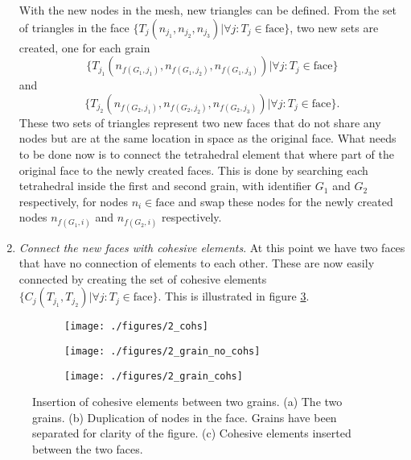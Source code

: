 \documentclass[grain_boundary_law.tex]{subfiles}
\begin{document}
\begin{enumerate}
With the new nodes in the mesh, new triangles can be defined. From the set of triangles in the face $\{ T_j(n_{j_1}, n_{j_2}, n_{j_3}) | \forall j: T_j \in \text{face} \}$, two new sets are created, one for each grain 
\[ \{ T_{j_1}(n_{f(G_1,j_1)}, n_{f(G_1,j_2)}, n_{f(G_1,j_3)}) | \forall j: {T_{j} \in \text{face} \}} \]
 and 
\[ \{ T_{j_2}(n_{f(G_2,j_1)}, n_{f(G_2,j_2)}, n_{f(G_2,j_3)}) | \forall j: {T_{j} \in \text{face} \}}.\]  
 These two sets of triangles represent two new faces that do not share any nodes but are at the same location in space as the original face. What needs to be done now is to connect the tetrahedral element that where part of the original face to the newly created faces. This is done by searching each tetrahedral inside the first and second grain, with identifier $G_1$ and $G_2$ respectively, for nodes $n_i \in \text{face}$ and swap these nodes for the newly created nodes  $n_{f(G_1, i)}$ and $n_{f(G_2, i)}$ respectively.

\item \textit{Connect the new faces with cohesive elements}. At this point we have two faces that have no connection of elements to each other. These are now easily connected by creating the set of cohesive elements $ \{ C_j(T_{j_1},T_{j_2}) |  \forall j: T_j \in \text{face}  \} $. This is illustrated in figure \ref{fig:cohs_2_c}. 
\end{enumerate}


\begin{figure}[htpb!]
\centering
\begin{subfigure}[b]{.5\linewidth}
  \centering
  \texttt{[image: ./figures/2\_cohs]}
  \caption{}
  \label{fig:cohs_2_a}
\end{subfigure}%
\hspace{-10mm}
\begin{subfigure}[b]{.5\linewidth}
  \centering
  \texttt{[image: ./figures/2\_grain\_no\_cohs]}
  \caption{}
  \label{fig:cohs_2_b}
\end{subfigure}%
\hspace{-10mm}
\begin{subfigure}[b]{.5\linewidth}
  \centering
  \texttt{[image: ./figures/2\_grain\_cohs]}
  \caption{}
  \label{fig:cohs_2_c}
\end{subfigure}
\caption{Insertion of cohesive elements between two grains. (a) The two grains. (b) Duplication of nodes in the face. Grains have been separated for clarity of the figure. (c) Cohesive elements inserted between the two faces. }
\label{fig:cohs_2}
\end{figure}
\end{document}
